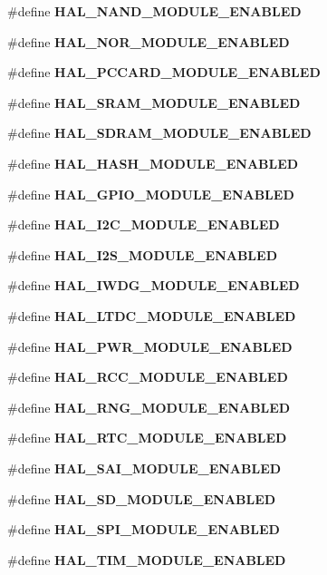 \begin{DoxyCompactItemize}
\item 
\#define \textbf{ H\+A\+L\+\_\+\+N\+A\+N\+D\+\_\+\+M\+O\+D\+U\+L\+E\+\_\+\+E\+N\+A\+B\+L\+ED}
\item 
\#define \textbf{ H\+A\+L\+\_\+\+N\+O\+R\+\_\+\+M\+O\+D\+U\+L\+E\+\_\+\+E\+N\+A\+B\+L\+ED}
\item 
\#define \textbf{ H\+A\+L\+\_\+\+P\+C\+C\+A\+R\+D\+\_\+\+M\+O\+D\+U\+L\+E\+\_\+\+E\+N\+A\+B\+L\+ED}
\item 
\#define \textbf{ H\+A\+L\+\_\+\+S\+R\+A\+M\+\_\+\+M\+O\+D\+U\+L\+E\+\_\+\+E\+N\+A\+B\+L\+ED}
\item 
\#define \textbf{ H\+A\+L\+\_\+\+S\+D\+R\+A\+M\+\_\+\+M\+O\+D\+U\+L\+E\+\_\+\+E\+N\+A\+B\+L\+ED}
\item 
\#define \textbf{ H\+A\+L\+\_\+\+H\+A\+S\+H\+\_\+\+M\+O\+D\+U\+L\+E\+\_\+\+E\+N\+A\+B\+L\+ED}
\item 
\#define \textbf{ H\+A\+L\+\_\+\+G\+P\+I\+O\+\_\+\+M\+O\+D\+U\+L\+E\+\_\+\+E\+N\+A\+B\+L\+ED}
\item 
\#define \textbf{ H\+A\+L\+\_\+\+I2\+C\+\_\+\+M\+O\+D\+U\+L\+E\+\_\+\+E\+N\+A\+B\+L\+ED}
\item 
\#define \textbf{ H\+A\+L\+\_\+\+I2\+S\+\_\+\+M\+O\+D\+U\+L\+E\+\_\+\+E\+N\+A\+B\+L\+ED}
\item 
\#define \textbf{ H\+A\+L\+\_\+\+I\+W\+D\+G\+\_\+\+M\+O\+D\+U\+L\+E\+\_\+\+E\+N\+A\+B\+L\+ED}
\item 
\#define \textbf{ H\+A\+L\+\_\+\+L\+T\+D\+C\+\_\+\+M\+O\+D\+U\+L\+E\+\_\+\+E\+N\+A\+B\+L\+ED}
\item 
\#define \textbf{ H\+A\+L\+\_\+\+P\+W\+R\+\_\+\+M\+O\+D\+U\+L\+E\+\_\+\+E\+N\+A\+B\+L\+ED}
\item 
\#define \textbf{ H\+A\+L\+\_\+\+R\+C\+C\+\_\+\+M\+O\+D\+U\+L\+E\+\_\+\+E\+N\+A\+B\+L\+ED}
\item 
\#define \textbf{ H\+A\+L\+\_\+\+R\+N\+G\+\_\+\+M\+O\+D\+U\+L\+E\+\_\+\+E\+N\+A\+B\+L\+ED}
\item 
\#define \textbf{ H\+A\+L\+\_\+\+R\+T\+C\+\_\+\+M\+O\+D\+U\+L\+E\+\_\+\+E\+N\+A\+B\+L\+ED}
\item 
\#define \textbf{ H\+A\+L\+\_\+\+S\+A\+I\+\_\+\+M\+O\+D\+U\+L\+E\+\_\+\+E\+N\+A\+B\+L\+ED}
\item 
\#define \textbf{ H\+A\+L\+\_\+\+S\+D\+\_\+\+M\+O\+D\+U\+L\+E\+\_\+\+E\+N\+A\+B\+L\+ED}
\item 
\#define \textbf{ H\+A\+L\+\_\+\+S\+P\+I\+\_\+\+M\+O\+D\+U\+L\+E\+\_\+\+E\+N\+A\+B\+L\+ED}
\item 
\#define \textbf{ H\+A\+L\+\_\+\+T\+I\+M\+\_\+\+M\+O\+D\+U\+L\+E\+\_\+\+E\+N\+A\+B\+L\+ED}

\end{DoxyCompactItemize}
